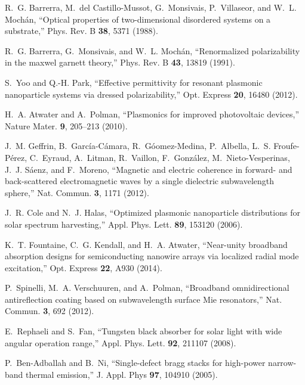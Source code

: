 \documentclass[10pt,letterpaper]{article}
\begin{document}
\begin{thebibliography}{100}
R.~G. Barrerra, M.~{del Castillo-Mussot}, G.~Monsivais, P.~Villaseor, and W.~L.
  Moch\'{a}n, \enquote{Optical properties of two-dimensional disordered systems
  on a substrate,} Phys. Rev. B \textbf{38}, 5371 (1988).

R.~G. Barrerra, G.~Monsivais, and W.~L. Moch\'{a}n, \enquote{Renormalized
  polarizability in the maxwel garnett theory,} Phys. Rev. B \textbf{43}, 13819
  (1991).

S.~Yoo and Q.-H. Park, \enquote{Effective permittivity for resonant plasmonic
  nanoparticle systems via dressed polarizability,} Opt. Express \textbf{20},
  16480 (2012).

H.~A. Atwater and A.~Polman, \enquote{Plasmonics for improved photovoltaic
  devices,} Nature Mater. \textbf{9}, 205--213 (2010).

J.~M. Geffrin, B.~Garc\'{i}a-C\'{a}mara, R.~G\'{o}omez-Medina, P.~Albella,
  L.~S. Froufe-P\'{e}rez, C.~Eyraud, A.~Litman, R.~Vaillon, F.~Gonz\'{a}lez,
  M.~Nieto-Vesperinas, J.~J. S\'{a}enz, and F.~Moreno, \enquote{Magnetic and
  electric coherence in forward- and back-scattered electromagnetic waves by a
  single dielectric subwavelength sphere,} Nat. Commun. \textbf{3}, 1171
  (2012).

J.~R. Cole and N.~J. Halas, \enquote{Optimized plasmonic nanoparticle
  distributions for solar spectrum harvesting,} Appl. Phys. Lett. \textbf{89},
  153120 (2006).

K.~T. Fountaine, C.~G. Kendall, and H.~A. Atwater, \enquote{Near-unity
  broadband absorption designs for semiconducting nanowire arrays via localized
  radial mode excitation,} Opt. Express \textbf{22}, A930 (2014).

P.~Spinelli, M.~A. Verschuuren, and A.~Polman, \enquote{Broadband
  omnidirectional antireflection coating based on subwavelength surface {M}ie
  resonators,} Nat. Commun. \textbf{3}, 692 (2012).

E.~Rephaeli and S.~Fan, \enquote{Tungsten black absorber for solar light with
  wide angular operation range,} Appl. Phys. Lett. \textbf{92}, 211107 (2008).

P.~Ben-Adballah and B.~Ni, \enquote{Single-defect bragg stacks for high-power
  narrow-band thermal emission,} J. Appl. Phys \textbf{97}, 104910 (2005).


\end{thebibliography}
\end{document}
